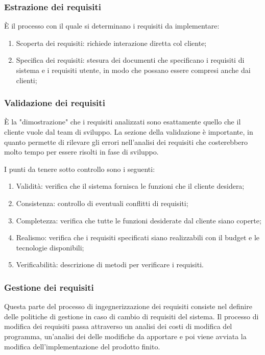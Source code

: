 \documentclass[a4paper, 10pt]{article}
\begin{document}
	\subsubsection{Estrazione dei requisiti}
	È il processo con il quale si determinano i requisiti da implementare:
	\begin{enumerate}
		\item Scoperta dei requisiti: richiede interazione diretta col cliente;
		\item Specifica dei requisiti: stesura dei documenti che specificano i requisiti di sistema e i requisiti utente, in modo che possano essere compresi anche dai clienti;
	\end{enumerate}

	\subsubsection{Validazione dei requisiti}
	È la "dimostrazione" che i requisiti analizzati sono esattamente quello che il cliente vuole dal team di sviluppo. La sezione della validazione è importante, in quanto permette di rilevare gli errori nell'analisi dei requisiti che costerebbero molto tempo per essere risolti in fase di sviluppo.
	
	I punti da tenere sotto controllo sono i seguenti:
	\begin{enumerate}
		\item Validità: verifica che il sistema fornisca le funzioni che il cliente desidera;
		\item Consistenza: controllo di eventuali conflitti di requisiti;
		\item Completezza: verifica che tutte le funzioni desiderate dal cliente siano coperte;
		\item Realismo: verifica che i requisiti specificati siano realizzabili con il budget e le tecnologie disponibili;
		\item Verificabilità: descrizione di metodi per verificare i requisiti.
	\end{enumerate}

	\subsubsection{Gestione dei requisiti}
	Questa parte del processo di ingegnerizzazione dei requisiti consiste nel definire delle politiche di gestione in caso di cambio di requisiti del sistema.
	Il processo di modifica dei requisiti passa attraverso un analisi dei costi di modifica del programma, un'analisi dei delle modifiche da apportare e poi viene avviata la modifica dell'implementazione del prodotto finito.
	
	
	
\end{document}
